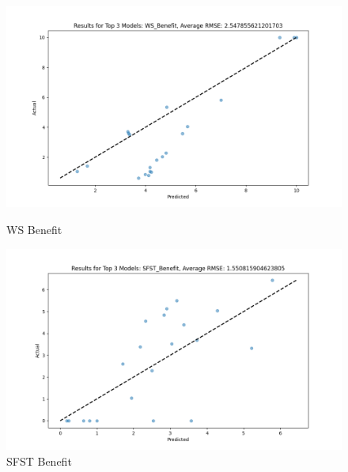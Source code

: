 \begin{figure}[H]
    \centering
    \begin{minipage}{0.495\textwidth}
        \centering
        \includegraphics[width=\linewidth]{reg_section_specxtra/images_reg_ensemble/ensemble_learning_rmse_plot_top_3_Models_WS_Benefit.png}
        \caption{WS Benefit}
        \label{fig:ws_ben_ensemble}
    \end{minipage}\hfill
    \begin{minipage}{0.495\textwidth}
        \centering
        \includegraphics[width=\linewidth]{reg_section_specxtra/images_reg_ensemble/ensemble_learning_rmse_plot_top_3_Models_SFST_Benefit.png}
        \caption{SFST Benefit}
        \label{fig:sfst_ben_ensemble}
    \end{minipage}
\end{figure}